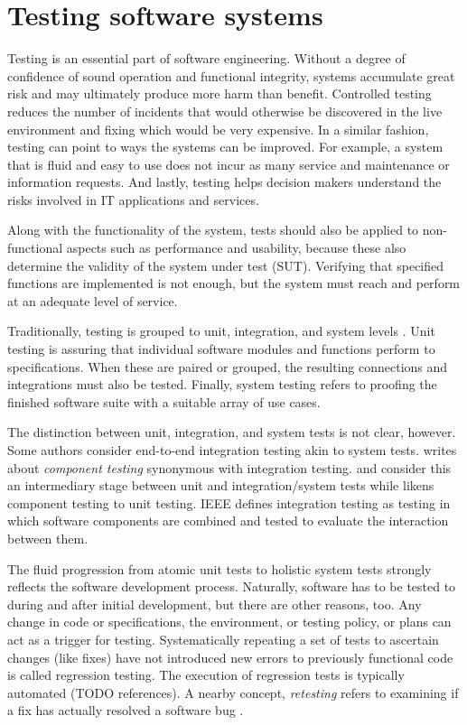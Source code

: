 \documentclass[12pt,a4paper,oneside,pdftex]{report}
\begin{document}
\section{Testing software systems}

Testing is an essential part of software engineering. Without a degree of confidence of sound operation and functional integrity, systems accumulate great risk and may ultimately produce more harm than benefit. Controlled testing reduces the number of incidents that would otherwise be discovered in the live environment and fixing which would be very expensive. \citep{jenkins2008software, liu2009unified} In a similar fashion, testing can point to ways the systems can be improved. For example, a system that is fluid and easy to use does not incur as many service and maintenance or information requests. And lastly, testing helps decision makers understand the risks involved in IT applications and services.

Along with the functionality of the system, tests should also be applied to non-functional aspects such as performance and usability, because these also determine the validity of the system under test (SUT). Verifying that specified functions are implemented is not enough, but the system must reach and perform at an adequate level of service. %

Traditionally, testing is grouped to unit, integration, and system levels \citep{jenkins2008software, burnstein2003practical}. Unit testing is assuring that individual software modules and functions perform to specifications. When these are paired or grouped, the resulting connections and integrations must also be tested. Finally, system testing refers to proofing the finished software suite with a suitable array of use cases. 

The distinction between unit, integration, and system tests is not clear, however. Some authors consider end-to-end integration testing akin to system tests. \citet{duvall2007continuous} writes about \emph{component testing} synonymous with integration testing. \citet{pezze2008software} and \citet{benz2007combining} consider this an intermediary stage between unit and integration/system tests while \citet{burnstein2003practical} likens component testing to unit testing. IEEE defines integration testing as testing in which software components are combined and tested to evaluate the interaction between them. %

The fluid progression from atomic unit tests to holistic system tests strongly reflects the software development process. Naturally, software has to be tested to during and after initial development, but there are other reasons, too. Any change in code or specifications, the environment, or testing policy, or plans can act as a trigger for testing. Systematically repeating a set of tests to ascertain changes (like fixes) have not introduced new errors to previously functional code is called regression testing. The execution of regression tests is typically automated (TODO references). A nearby concept, \textit{retesting} refers to examining if a fix has actually resolved a software bug \citep{jenkins2008software}.
\end{document}
